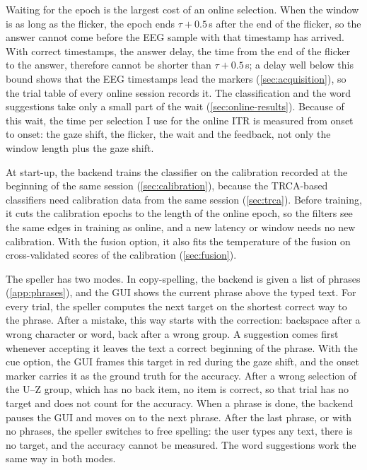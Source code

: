 Waiting for the epoch is the largest cost of an online selection. When the window is
as long as the flicker, the epoch ends $\tau + 0.5$\,s after the end of the flicker, so
the answer cannot come before the \ac{EEG} sample with that timestamp has arrived. With
correct timestamps, the answer delay, the time from the end of the flicker to the
answer, therefore cannot be shorter than $\tau + 0.5$\,s; a delay well below this bound
shows that the \ac{EEG} timestamps lead the markers (\cref{sec:acquisition}), so the trial table of every
online session records it. The classification and the word suggestions take only a
small part of the wait (\cref{sec:online-results}). Because of this wait, the time per
selection I use for the online \ac{ITR} is measured from onset to onset: the gaze shift,
the flicker, the wait and the feedback, not only the window length plus the gaze shift.

At start-up, the backend trains the classifier on the calibration recorded at the
beginning of the same session (\cref{sec:calibration}), because the \ac{TRCA}-based
classifiers need calibration data from the same session (\cref{sec:trca}). Before
training, it cuts the calibration epochs to the length of the online epoch, so the
filters see the same edges in training as online, and a new latency or window needs no
new calibration. With the fusion option, it also fits the temperature of the fusion on
cross-validated scores of the calibration (\cref{sec:fusion}).

The speller has two modes. In copy-spelling, the backend is given a list of phrases 
(\cref{app:phrases}), and the \ac{GUI} shows the current phrase above the typed text.
For every trial, the speller computes the next target on the shortest correct way to
the phrase. After a mistake, this way starts with the correction: backspace after a
wrong character or word, back after a wrong group. A suggestion comes first whenever
accepting it leaves the text a correct beginning of the phrase. With the cue option,
the \ac{GUI} frames this target in red during the gaze shift, and the onset marker
carries it as the ground truth for the accuracy. After a wrong selection of the U--Z
group, which has no back item, no item is correct, so that trial has no target and does
not count for the accuracy. When a phrase is done, the backend pauses the \ac{GUI} and
moves on to the next phrase. After the last phrase, or with no phrases, the speller
switches to free spelling: the user types any text, there is no target, and the
accuracy cannot be measured. The word suggestions work the same way in both modes.

